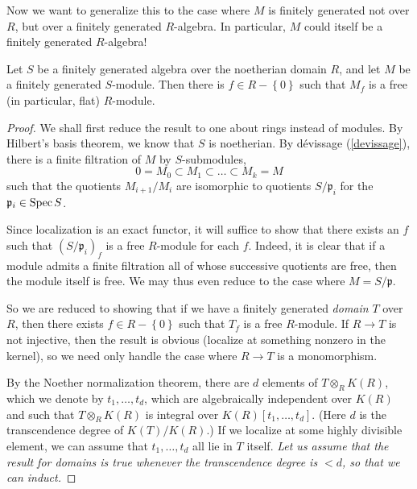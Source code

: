 Now we want to generalize this to the case where $M$ is finitely generated not
over $R$, but over a finitely generated $R$-algebra. In particular, $M$ could
itself be a finitely generated $R$-algebra! 

\begin{theorem}
Let $S$ be a finitely generated algebra over the noetherian domain $R$, and
let $M$ be a finitely generated $S$-module. Then there is $f \in R -
\left\{0\right\}$ such that $M_f$ is a free (in particular, flat) $R$-module.
\end{theorem} 
\begin{proof} We shall first reduce the result to one about rings instead of
modules. By Hilbert's basis theorem, we know that $S$ is noetherian. 
By d\'evissage (\cref{devissage}), there is a finite filtration of $M$ by
$S$-submodules, 
\[ 0 = M_0 \subset M_1 \subset \dots \subset M_k = M  \]
such that the quotients $M_{i+1}/M_i$ are isomorphic to quotients
$S/\mathfrak{p}_i$ for the $\mathfrak{p}_i \in \operatorname{Spec} S$.

Since localization is an exact functor, it will suffice to show that there
exists an $f$ such that $(S/\mathfrak{p}_i)_f$ is a free $R$-module for each
$f$. Indeed, it is clear that if a module admits a finite filtration all of
whose successive quotients are free, then the module itself is free.
We may thus even reduce to the case where $M = S/\mathfrak{p}$.

So we are reduced to showing that if we have a finitely generated
\emph{domain} $T$ over $R$, then there exists $f \in R - \left\{0\right\}$
such that $T_f$ is a free $R$-module. 
If $R \to T$ is not injective, then the result is obvious (localize at
something nonzero in the kernel), so we need only handle the case where $R \to
T$ is a monomorphism.


By the Noether normalization theorem, there are $d$  elements of $T \otimes_R K(R)$, which we
denote by $t_1, \dots, t_d$, which are algebraically independent over $K(R)$
and such that $T \otimes_R K(R)$ is integral over $K(R)[t_1, \dots, t_d]$.
(Here $d$ is the transcendence degree of $K(T)/
K(R)$.)
If we localize at some highly divisible element, we can assume that $t_1,
\dots, t_d$ all lie in $T$ itself. \emph{Let us assume that the result for
domains is true whenever the transcendence degree is $< d$, so that we can
induct.}


\end{proof}
